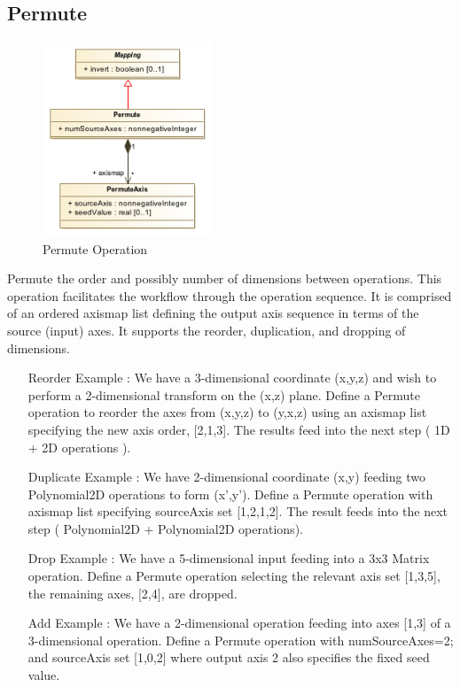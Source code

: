   \subsection{Permute}
  \label{sect:Permute}
    \begin{figure}[h]
    \begin{center}
      \includegraphics[width=2.0in]{diagrams/permute_operation.png}
      \caption{Permute Operation}\label{fig:PermuteOps}
    \end{center}
    \end{figure}
    Permute the order and possibly number of dimensions between operations. This operation facilitates the workflow through the operation sequence. It is comprised of an ordered axismap list defining the output axis sequence in terms of the source (input) axes. It supports the reorder, duplication, and dropping of dimensions. 
    \begin{itemize}
    \item[Reorder Example]: We have a 3-dimensional coordinate (x,y,z) and wish to perform a 2-dimensional transform on the (x,z) plane. Define a Permute operation to reorder the axes from (x,y,z) to (y,x,z) using an axismap list specifying the new axis order, [2,1,3]. The results feed into the next step ( 1D + 2D operations ). 
    \item[Duplicate Example]: We have 2-dimensional coordinate (x,y) feeding two Polynomial2D operations to form (x',y'). Define a Permute operation with axismap list specifying sourceAxis set [1,2,1,2]. The result feeds into the next step ( Polynomial2D + Polynomial2D operations). 
    \item[Drop Example]: We have a 5-dimensional input feeding into a 3x3 Matrix operation. Define a Permute operation selecting the relevant axis set [1,3,5], the remaining axes, [2,4], are dropped. 
    \item[Add Example]: We have a 2-dimensional operation feeding into axes [1,3] of a 3-dimensional operation. Define a Permute operation with numSourceAxes=2; and sourceAxis set [1,0,2] where output axis 2 also specifies the fixed seed value.
    \end{itemize}


